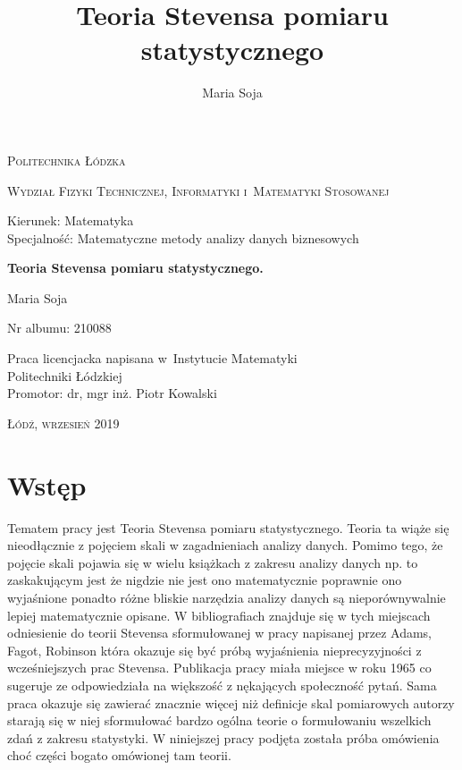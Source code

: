 \documentclass[12pt,a4paper]{report}
\author{Maria Soja}
\title{Teoria Stevensa pomiaru statystycznego}
\begin{document}
\begin{titlepage}
\begin{flushleft}
\end{flushleft}
\begin{center}
\textsc{{\huge Politechnika Łódzka}}
\end{center}
\bigskip
\bigskip
\begin{center}
\textsc{{\Large Wydział Fizyki Technicznej, Informatyki i~Matematyki Stosowanej}}
\end{center}
\bigskip
\bigskip
\begin{Large}
Kierunek: Matematyka 
\\Specjalność: Matematyczne metody analizy danych biznesowych

\end{Large}
\bigskip
\bigskip
\noindent\hrulefill
\begin{center}
{\textbf{{\Large Teoria Stevensa pomiaru statystycznego.}}}
\end{center}
\begin{flushright}
{\large 
Maria Soja

Nr albumu: 
210088
}
\end{flushright}
\noindent\hrulefill
\bigskip
\bigskip
\begin{center}
{\large Praca licencjacka
napisana w~Instytucie Matematyki 
\\Politechniki Łódzkiej 
\bigskip
\bigskip
\\Promotor: dr, mgr inż. Piotr Kowalski
 }
\end{center}
\bigskip
\bigskip
\bigskip
\bigskip
\begin{center}
{\textsc{\large Łódź, wrzesień 2019}}
\end{center}
\end{titlepage}


\tableofcontents

\chapter{Wstęp}

Tematem pracy jest Teoria Stevensa pomiaru statystycznego. Teoria ta wiąże się nieodłącznie z pojęciem skali w zagadnieniach analizy danych. Pomimo tego, że pojęcie skali pojawia się w wielu książkach z zakresu analizy danych np. {\citep{walesiak2009statystyczna}} to zaskakującym jest że nigdzie nie jest ono matematycznie poprawnie ono wyjaśnione ponadto różne bliskie narzędzia analizy danych są nieporównywalnie lepiej matematycznie opisane. W bibliografiach znajduje się w tych miejscach odniesienie do teorii Stevensa sformułowanej w pracy napisanej przez Adams, Fagot, Robinson {\citep{adams1965theory}} która okazuje się być próbą wyjaśnienia nieprecyzyjności z wcześniejszych prac Stevensa. Publikacja pracy miała miejsce w roku 1965 co sugeruje ze odpowiedziała na większość z nękających społeczność pytań. Sama praca okazuje się zawierać znacznie więcej niż definicje skal pomiarowych autorzy starają się w niej sformułować bardzo ogólna teorie o formułowaniu wszelkich zdań z zakresu statystyki. W niniejszej pracy podjęta została próba omówienia choć części bogato omówionej tam teorii. 
 
\end{document}
